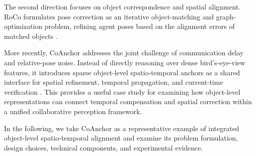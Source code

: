 \documentclass[12pt, a4paper, twoside]{article}
\begin{document}
The second direction focuses on object correspondence and spatial alignment. 
RoCo formulates pose correction as an iterative object-matching and graph-optimization problem, refining agent poses based on the alignment errors of matched objects \cite{huang2024roco}.

More recently, CoAnchor addresses the joint challenge of communication delay and relative-pose noise. 
Instead of directly reasoning over dense bird's-eye-view features, it introduces sparse object-level spatio-temporal anchors as a shared interface for spatial refinement, temporal propagation, and current-time verification \cite{li2026coanchor}. 
This provides a useful case study for examining how object-level representations can connect temporal compensation and spatial correction within a unified collaborative perception framework.

In the following, we take CoAnchor as a representative example of integrated object-level spatio-temporal alignment and examine its problem formulation, design choices, technical components, and experimental evidence.

 
\end{document}
